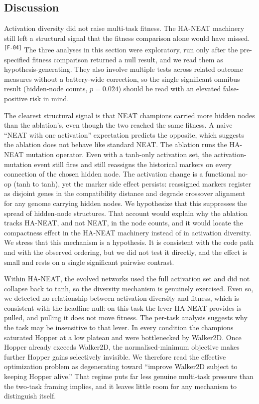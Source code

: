 \documentclass[12pt]{article}
\newcommand{\revID}[1]{\textsuperscript{\scriptsize\texttt{[#1]}}}
\newcommand{\revFlow}[2]{\textcolor{revPurple}{#2}\revID{#1}}
\begin{document}
\subsection{Discussion}
\label{sec:main-discussion}

\revFlow{F-04}{Activation diversity did not raise multi-task fitness.
The HA-NEAT machinery still left a structural signal that the fitness comparison alone would have missed.}
The three analyses in this section were exploratory, run only after the pre-specified fitness comparison returned a null result, and we read them as hypothesis-generating.
They also involve multiple tests across related outcome measures without a battery-wide correction, so the single significant omnibus result (hidden-node counts, $p = 0.024$) should be read with an elevated false-positive risk in mind.

The clearest structural signal is that NEAT champions carried more hidden nodes than the ablation's, even though the two reached the same fitness.
A naive ``NEAT with one activation'' expectation predicts the opposite, which suggests the ablation does not behave like standard NEAT.
The ablation runs the HA-NEAT mutation operator.
Even with a tanh-only activation set, the activation-mutation event still fires and still reassigns the historical markers on every connection of the chosen hidden node.
The activation change is a functional no-op (tanh to tanh), yet the marker side effect persists: reassigned markers register as disjoint genes in the compatibility distance and degrade crossover alignment for any genome carrying hidden nodes.
We hypothesize that this suppresses the spread of hidden-node structures.
That account would explain why the ablation tracks HA-NEAT, and not NEAT, in the node counts, and it would locate the compactness effect in the HA-NEAT machinery instead of in activation diversity.
We stress that this mechanism is a hypothesis.
It is consistent with the code path and with the observed ordering, but we did not test it directly, and the effect is small and rests on a single significant pairwise contrast.

Within HA-NEAT, the evolved networks used the full activation set and did not collapse back to tanh, so the diversity mechanism is genuinely exercised.
Even so, we detected no relationship between activation diversity and fitness, which is consistent with the headline null: on this task the lever HA-NEAT provides is pulled, and pulling it does not move fitness.
The per-task analysis suggests why the task may be insensitive to that lever.
In every condition the champions saturated Hopper at a low plateau and were bottlenecked by Walker2D.
Once Hopper already exceeds Walker2D, the normalised-minimum objective makes further Hopper gains selectively invisible.
We therefore read the effective optimization problem as degenerating toward ``improve Walker2D subject to keeping Hopper alive.''
That regime puts far less genuine multi-task pressure than the two-task framing implies, and it leaves little room for any mechanism to distinguish itself.
\end{document}
